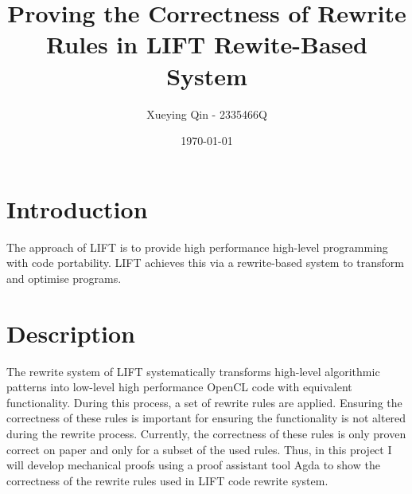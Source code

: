 \documentclass[]{article}
\begin{document}
%

\title{Proving the Correctness of Rewrite Rules in LIFT Rewite-Based System}
\author{Xueying Qin - 2335466Q}
\date{\small\today}

\maketitle

\section{Introduction}
The approach of LIFT is to provide high performance high-level programming with code portability. LIFT achieves this via a rewrite-based system to transform and optimise programs.

\section{Description}
The rewrite system of LIFT systematically transforms high-level algorithmic patterns into low-level high performance OpenCL code with equivalent functionality. During this process, a set of rewrite rules are applied. Ensuring the correctness of these rules is important for ensuring the functionality is not altered during the rewrite process. Currently, the correctness of these rules is only proven correct on paper and only for a subset of the used rules. Thus, in this project I will develop mechanical proofs using a proof assistant tool Agda to show the correctness of the rewrite rules used in LIFT code rewrite system.
\end{document}
